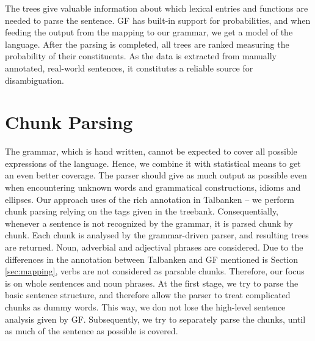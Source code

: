 \documentclass[runningheads,a4paper]{llncs}
\begin{document}
The trees give valuable 
information about which lexical entries and functions
are needed to parse the sentence.
GF has built-in support for probabilities, and when feeding the output
from the mapping to our grammar, we get a model of the language. 
After the parsing is completed, all trees are ranked measuring the
probability of their constituents.
As the data is extracted from manually annotated, real-world sentences,
it constitutes a reliable source for disambiguation.


\section{Chunk Parsing}
\label{sec:chunk}
The grammar, which is hand written, cannot be expected to cover all
possible expressions of the language.
Hence, we combine it with statistical means to get an even better coverage. 
The parser should give as much output as possible 
even when encountering unknown words and grammatical constructions,
idioms and ellipses.
Our approach uses of the rich annotation in Talbanken -- we perform chunk parsing
relying on the tags given in the treebank. 
Consequentially, whenever a sentence is not recognized by the grammar, it is 
parsed chunk by chunk. Each chunk is analysed by the grammar-driven parser, and
resulting trees are returned.
Noun, adverbial and adjectival phrases are considered.
Due to the differences in the annotation between Talbanken and
GF mentioned is Section \ref{sec:mapping}, verbs are not considered
as parsable chunks. %
Therefore, our focus is on whole sentences and noun phrases. At the first stage,
we try to parse the basic sentence structure, and therefore allow the parser
to treat complicated chunks as dummy words. This way, we don not lose the 
high-level sentence analysis given by GF.
Subsequently, we try to separately parse the chunks,
until as much of the sentence as possible is covered. 


\end{document}
